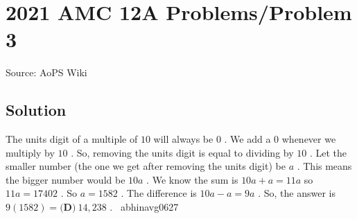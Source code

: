 \documentclass[12pt]{article}
\begin{document}
\section*{{2021 AMC 12A Problems/Problem 3}}
Source: AoPS Wiki

\subsection*{Solution}
The units digit of a multiple of $10$ will always be $0$ . We add a $0$ whenever we multiply by $10$ . So, removing the units digit is equal to dividing by $10$ . Let the smaller number (the one we get after removing the units digit) be $a$ . This means the bigger number would be $10a$ . We know the sum is $10a+a = 11a$ so $11a=17402$ . So $a=1582$ . The difference is $10a-a = 9a$ . So, the answer is $9(1582) = \boxed{\textbf{(D)} ~14{,}238}$ . ~abhinavg0627
\end{document}
